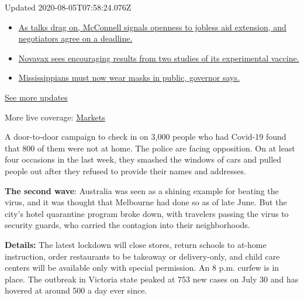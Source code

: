 Updated 2020-08-05T07:58:24.076Z

\begin{itemize}
\tightlist
\item
  \href{https://www.nytimes3xbfgragh.onion/2020/08/04/world/coronavirus-cases.html?action=click\&pgtype=Article\&state=default\&region=MAIN_CONTENT_1\&context=storylines_live_updates\#link-762df92}{As
  talks drag on, McConnell signals openness to jobless aid extension,
  and negotiators agree on a deadline.}
\item
  \href{https://www.nytimes3xbfgragh.onion/2020/08/04/world/coronavirus-cases.html?action=click\&pgtype=Article\&state=default\&region=MAIN_CONTENT_1\&context=storylines_live_updates\#link-1228a480}{Novavax
  sees encouraging results from two studies of its experimental
  vaccine.}
\item
  \href{https://www.nytimes3xbfgragh.onion/2020/08/04/world/coronavirus-cases.html?action=click\&pgtype=Article\&state=default\&region=MAIN_CONTENT_1\&context=storylines_live_updates\#link-794484ed}{Mississippians
  must now wear masks in public, governor says.}
\end{itemize}

\href{https://www.nytimes3xbfgragh.onion/2020/08/04/world/coronavirus-cases.html?action=click\&pgtype=Article\&state=default\&region=MAIN_CONTENT_1\&context=storylines_live_updates}{See
more updates}

More live coverage:
\href{https://www.nytimes3xbfgragh.onion/live/2020/08/04/business/stock-market-today-coronavirus?action=click\&pgtype=Article\&state=default\&region=MAIN_CONTENT_1\&context=storylines_live_updates}{Markets}

A door-to-door campaign to check in on 3,000 people who had Covid-19
found that 800 of them were not at home. The police are facing
opposition. On at least four occasions in the last week, they smashed
the windows of cars and pulled people out after they refused to provide
their names and addresses.

\textbf{The second wave}: Australia was seen as a shining example for
beating the virus, and it was thought that Melbourne had done so as of
late June. But the city's hotel quarantine program broke down, with
travelers passing the virus to security guards, who carried the
contagion into their neighborhoods.

\textbf{Details:} The latest lockdown will close stores, return schools
to at-home instruction, order restaurants to be takeaway or
delivery-only, and child care centers will be available only with
special permission. An 8 p.m. curfew is in place. The outbreak in
Victoria state peaked at 753 new cases on July 30 and has hovered at
around 500 a day ever since.

